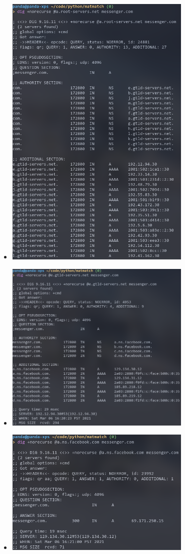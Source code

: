 \documentclass[11pt]{article}
\begin{document}
\begin{enumerate}[label=(\alph*)]
\begin{itemize}
\begin{itemize}
    \item \includegraphics[width=0.7\textwidth]{img/dig-messenger-1}
    \item \includegraphics[width=0.7\textwidth]{img/dig-messenger-2}
    \item \includegraphics[width=0.7\textwidth]{img/dig-messenger-3}

\end{itemize}
\end{itemize}
\end{enumerate}
\end{document}
